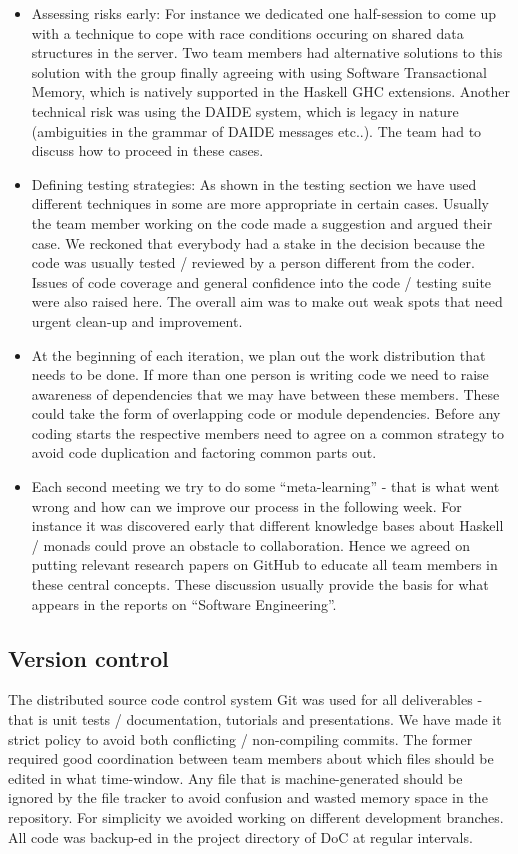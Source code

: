\documentclass[pdftex,12pt,a4paper]{report}
\begin{document}
\begin{itemize}
\item Assessing risks early: For instance we dedicated one
  half-session to come up with a technique to cope with race
  conditions occuring on shared data structures in the server. Two
  team members had alternative solutions to this solution with the
  group finally agreeing with using Software Transactional Memory,
  which is natively supported in the Haskell GHC extensions. Another
  technical risk was using the DAIDE system, which is legacy in nature
  (ambiguities in the grammar of DAIDE messages etc..). The team had
  to discuss how to proceed in these cases.
\item Defining testing strategies: As shown in the testing section we
  have used different techniques in some are more appropriate in
  certain cases. Usually the team member working on the code made a
  suggestion and argued their case.  We reckoned that everybody had a
  stake in the decision because the code was usually tested / reviewed
  by a person different from the coder. Issues of code coverage and
  general confidence into the code / testing suite were also raised
  here. The overall aim was to make out weak spots that need urgent
  clean-up and improvement.
\item At the beginning of each iteration, we plan out the work
  distribution that needs to be done. If more than one person is
  writing code we need to raise awareness of dependencies that we may
  have between these members. These could take the form of overlapping
  code or module dependencies. Before any coding starts the respective
  members need to agree on a common strategy to avoid code duplication
  and factoring common parts out.
\item Each second meeting we try to do some ``meta-learning'' - that
  is what went wrong and how can we improve our process in the
  following week. For instance it was discovered early that different
  knowledge bases about Haskell / monads could prove an obstacle to
  collaboration. Hence we agreed on putting relevant research papers
  on GitHub to educate all team members in these central
  concepts. These discussion usually provide the basis for what
  appears in the reports on ``Software Engineering''.

\end{itemize}

\subsection{Version control}
The distributed source code control system Git was used for all
deliverables - that is unit tests / documentation, tutorials and
presentations. We have made it strict policy to avoid both conflicting
/ non-compiling commits. The former required good coordination between
team members about which files should be edited in what
time-window. Any file that is machine-generated should be ignored by
the file tracker to avoid confusion and wasted memory space in the
repository. For simplicity we avoided working on different development
branches. All code was backup-ed in the project directory of DoC at
regular intervals.
\end{document}

